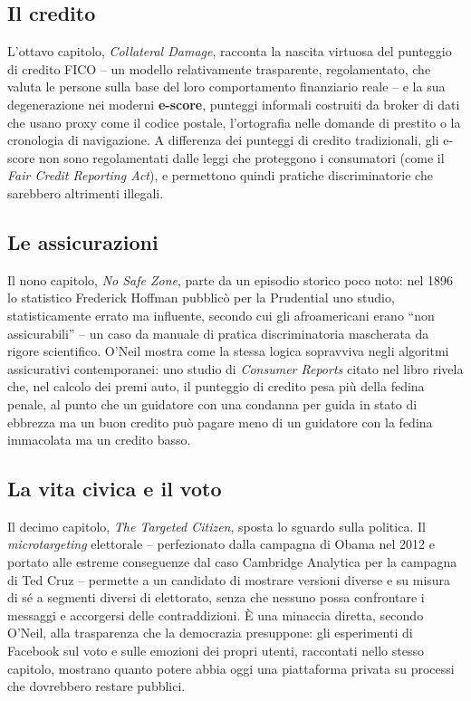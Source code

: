 \documentclass[a4paper,11pt]{article}
\begin{document}
\subsection{Il credito}

L'ottavo capitolo, \emph{Collateral Damage}, racconta la nascita virtuosa del punteggio di credito FICO -- un modello relativamente trasparente, regolamentato, che valuta le persone sulla base del loro comportamento finanziario reale -- e la sua degenerazione nei moderni \textbf{e-score}, punteggi informali costruiti da broker di dati che usano proxy come il codice postale, l'ortografia nelle domande di prestito o la cronologia di navigazione. A differenza dei punteggi di credito tradizionali, gli e-score non sono regolamentati dalle leggi che proteggono i consumatori (come il \emph{Fair Credit Reporting Act}), e permettono quindi pratiche discriminatorie che sarebbero altrimenti illegali.

\subsection{Le assicurazioni}

Il nono capitolo, \emph{No Safe Zone}, parte da un episodio storico poco noto: nel 1896 lo statistico Frederick Hoffman pubblicò per la Prudential uno studio, statisticamente errato ma influente, secondo cui gli afroamericani erano ``non assicurabili'' -- un caso da manuale di pratica discriminatoria mascherata da rigore scientifico. O'Neil mostra come la stessa logica sopravviva negli algoritmi assicurativi contemporanei: uno studio di \emph{Consumer Reports} citato nel libro rivela che, nel calcolo dei premi auto, il punteggio di credito pesa più della fedina penale, al punto che un guidatore con una condanna per guida in stato di ebbrezza ma un buon credito può pagare meno di un guidatore con la fedina immacolata ma un credito basso.

\subsection{La vita civica e il voto}

Il decimo capitolo, \emph{The Targeted Citizen}, sposta lo sguardo sulla politica. Il \emph{microtargeting} elettorale -- perfezionato dalla campagna di Obama nel 2012 e portato alle estreme conseguenze dal caso Cambridge Analytica per la campagna di Ted Cruz -- permette a un candidato di mostrare versioni diverse e su misura di sé a segmenti diversi di elettorato, senza che nessuno possa confrontare i messaggi e accorgersi delle contraddizioni. È una minaccia diretta, secondo O'Neil, alla trasparenza che la democrazia presuppone: gli esperimenti di Facebook sul voto e sulle emozioni dei propri utenti, raccontati nello stesso capitolo, mostrano quanto potere abbia oggi una piattaforma privata su processi che dovrebbero restare pubblici.
\end{document}
